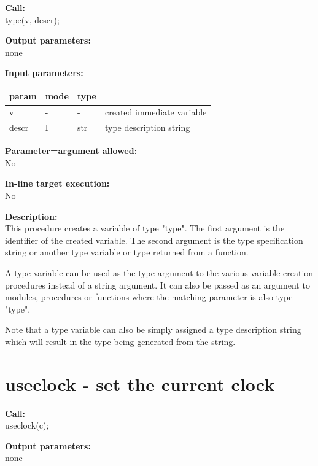         {\bf Call:} \\
        type(v, descr);
        
        {\bf Output parameters:} \\
        none
        
        {\bf Input parameters:} \\
        \begin{tabular}{| l | l | l | l |}
        \hline
        param  & mode       & type  & \\
        \hline \hline
        v     & - &  -  & created immediate variable    \\ \hline
        descr & I & str & type description string       \\ \hline
        \end{tabular}
        
        {\bf Parameter=argument allowed:} \\
        No
        
        {\bf In-line target execution:} \\
        No
        
        {\bf Description:} \\
        This procedure creates a variable of type "type". The first
        argument is the identifier of the created variable. The second
        argument is the type specification string or another type variable
        or type returned from a function.
        
        A type variable can be used as the type argument to the
        various variable creation procedures instead of a string
        argument. It can also be passed as an argument to
        modules, procedures or functions where the matching
        parameter is also type "type".
        
        Note that a type variable can also be simply assigned a type
        description string which will result in the type being generated
        from the string.


    \section{useclock - set the current clock}\label{sec:ipuseclock}
        
        {\bf Call:} \\
        useclock(c);
        
        {\bf Output parameters:} \\
        none
        
